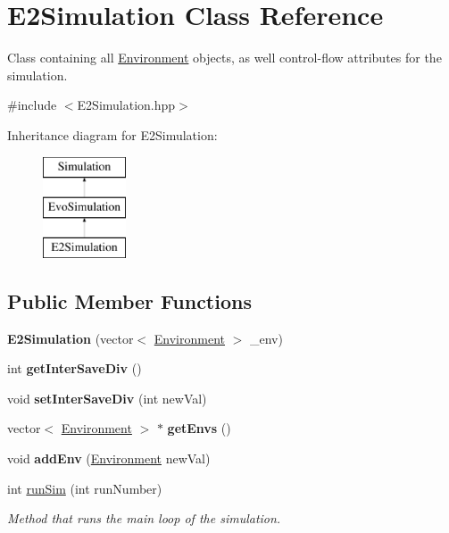 \hypertarget{classE2Simulation}{}\section{E2\+Simulation Class Reference}
\label{classE2Simulation}


Class containing all \hyperlink{classEnvironment}{Environment} objects, as well control-\/flow attributes for the simulation.  




{\ttfamily \#include $<$E2\+Simulation.\+hpp$>$}

Inheritance diagram for E2\+Simulation\+:\begin{figure}[H]
\begin{center}
\leavevmode
\includegraphics[height=3.000000cm]{classE2Simulation}
\end{center}
\end{figure}
\subsection*{Public Member Functions}
\begin{DoxyCompactItemize}
\item 
\mbox{\label{classE2Simulation_a489002277b77dde3163f335eeb174a9c}} 
{\bfseries E2\+Simulation} (vector$<$ \hyperlink{classEnvironment}{Environment} $>$ \+\_\+env)
\item 
\mbox{\label{classE2Simulation_aa814d76fc89318c950e936ba98adad7c}} 
int {\bfseries get\+Inter\+Save\+Div} ()
\item 
\mbox{\label{classE2Simulation_a440ebe2b5d56c6c3c7d67e6463347752}} 
void {\bfseries set\+Inter\+Save\+Div} (int new\+Val)
\item 
\mbox{\label{classE2Simulation_a5f07ce9232d20974595ea8191fb93bfe}} 
vector$<$ \hyperlink{classEnvironment}{Environment} $>$ $\ast$ {\bfseries get\+Envs} ()
\item 
\mbox{\label{classE2Simulation_ad7ce5318a2850d7a73df94aec1c7e15f}} 
void {\bfseries add\+Env} (\hyperlink{classEnvironment}{Environment} new\+Val)
\item 
int \hyperlink{classE2Simulation_a28028881fd443d2445b562512cb2169c}{run\+Sim} (int run\+Number)
\begin{DoxyCompactList}\small\item\em Method that runs the main loop of the simulation. \end{DoxyCompactList}\end{DoxyCompactItemize}
